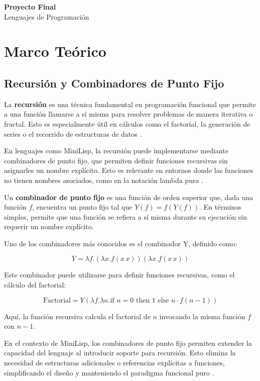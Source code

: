 \documentclass{article}
\begin{document}
  \begin{center}
    \textbf{\Large Proyecto Final}\\
    {\small Lenguajes de Programación}
  \end{center}
  \medskip

  \section{Marco Teórico}

  \subsection{Recursión y Combinadores de Punto Fijo}

  La \textbf{recursión} es una técnica fundamental en programación funcional que permite a una función llamarse a sí misma para resolver problemas de manera iterativa o fractal. Esto es especialmente útil en cálculos como el factorial, la generación de series o el recorrido de estructuras de datos \cite{bird1998introduction}.

  En lenguajes como MiniLisp, la recursión puede implementarse mediante combinadores de punto fijo, que permiten definir funciones recursivas sin asignarles un nombre explícito. Esto es relevante en entornos donde las funciones no tienen nombres asociados, como en la notación lambda pura \cite{barendregt1984lambda}.

  Un \textbf{combinador de punto fijo} es una función de orden superior que, dada una función \( f \), encuentra un punto fijo tal que \( Y(f) = f(Y(f)) \). En términos simples, permite que una función se refiera a sí misma durante su ejecución sin requerir un nombre explícito.

  Uno de los combinadores más conocidos es el combinador Y, definido como:

  \[
  Y = \lambda f.(\lambda x.f(x \, x))(\lambda x.f(x \, x))
  \]

  Este combinador puede utilizarse para definir funciones recursivas, como el cálculo del factorial:

  \[
  \text{Factorial} = Y(\lambda f. \lambda n. \text{if } n = 0 \text{ then } 1 \text{ else } n \cdot f(n-1))
  \]

  Aquí, la función recursiva calcula el factorial de \( n \) invocando la misma función \( f \) con \( n-1 \).

  En el contexto de MiniLisp, los combinadores de punto fijo permiten extender la capacidad del lenguaje al introducir soporte para recursión. Esto elimina la necesidad de estructuras adicionales o referencias explícitas a funciones, simplificando el diseño y manteniendo el paradigma funcional puro \cite{hutton2016programming}.
\end{document}
